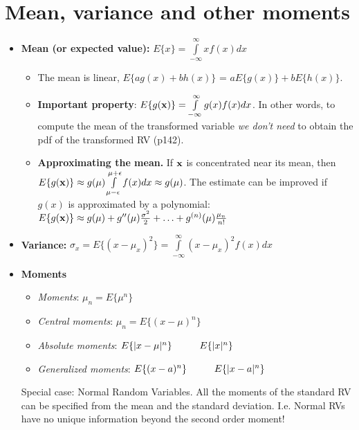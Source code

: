 \documentclass[a4paper, oneside]{book}
\begin{document}
\section{Mean, variance and other moments}
\begin{itemize}
\item \textbf{Mean (or expected value):} $E\{x\} = \int\limits_{-\infty}^{\infty} x f(x) dx$
	\begin{itemize}
	\item The mean is linear, $E\{a g(x) + b h(x) \}$ = $a E\{g(x)\} + b E\{h(x)\}$.
	\item \textbf{Important property}: $E\{g(\mathbf x)\} = \int\limits_{-\infty}^\infty g(x) f(x) dx $. In other words, to compute the mean of the transformed variable \textit{we don't need} to obtain the pdf of the transformed RV (p142).
	\item \textbf{Approximating the mean.} If $\mathbf x$ is concentrated near its mean, then $E\{g(\mathbf x)\} \approx g(\mu) \int\limits_{\mu-\epsilon}^{\mu+\epsilon} f(x) d x \approx g(\mu)$. The estimate can be improved if $g(x)$ is approximated by a polynomial: $E\{g(\mathbf x)\} \approx g(\mu) + g''(\mu) \frac{\sigma^2}{2} + \hdots  + g^{(n)}(\mu) \frac{\mu_n}{n!}$

	\end{itemize}
\item \textbf{Variance:} $\sigma_x = E\{(x-\mu_x)^2\} = \int\limits_{-\infty}^{\infty} (x-\mu_x)^2 f(x) dx$
\item \textbf{Moments}
	\begin{itemize}
	\item \textit{Moments}: $\mu_n = E\{\mu^n\}$
	\item \textit{Central moments}: $\mu_n = E\{(x-\mu)^n\}$
	\item \textit{Absolute moments}: $E\{|x-\mu|^n\} \hspace{1truecm} E\{|x|^n\}$
	\item \textit{Generalized moments}: $E\{(x-a)^n\} \hspace{1truecm} E\{|x-a|^n\}$
	\end{itemize}
	
Special case: Normal Random Variables. All the moments of the standard RV can be specified from the mean and the standard deviation. I.e. Normal RVs have no unique information beyond the second order moment!
\end{itemize}
\end{document}

